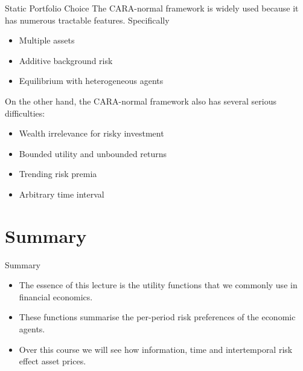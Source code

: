\documentclass[aspectratio=169,xcolor=dvipsnames]{beamer}
\begin{document}
\begin{frame}{Static Portfolio Choice}
    The CARA-normal framework is widely used because it has numerous tractable features. Specifically
    \begin{itemize}
        \item Multiple assets
        \item Additive background risk
        \item Equilibrium with heterogeneous agents
    \end{itemize}
    On the other hand, the CARA-normal framework also has several serious difficulties:
    \begin{itemize}
        \item Wealth irrelevance for risky investment
        \item Bounded utility and unbounded returns
        \item Trending risk premia
        \item Arbitrary time interval
    \end{itemize}
\end{frame}

\section{Summary}

\begin{frame}{Summary}
    \begin{itemize}
        \item The essence of this lecture is the utility functions that we commonly use in financial economics.
        \item These functions summarise the per-period risk preferences of the economic agents.
        \item Over this course we will see how information, time and intertemporal risk effect asset prices.
    \end{itemize}
\end{frame}
\end{document}
